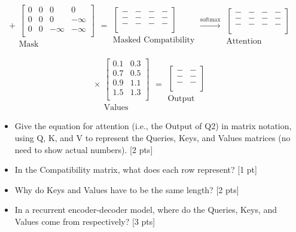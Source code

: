 \documentclass[11pt]{article}
\begin{document}
\[
+
\begin{array}{c}
\begin{bmatrix}
0 & 0 & 0 & 0 \\
0 & 0 & 0 & -\infty \\
0 & 0 & -\infty & -\infty \\
\end{bmatrix}\\
\text{Mask}
\end{array}
=
\begin{array}{c}
\begin{bmatrix}
- & - & - & - \\
- & - & - & - \\
- & - & - & - \\
\end{bmatrix}\\
\text{Masked Compatibility}
\end{array}
\xrightarrow{\text{softmax}}
\begin{array}{c}
\begin{bmatrix}
- & - & - & - \\
- & - & - & - \\
- & - & - & - \\
\end{bmatrix}\\
\text{Attention}
\end{array}
\]

\[
\times
\begin{array}{c}
\begin{bmatrix}
0.1 & 0.3 \\
0.7 & 0.5 \\
0.9 & 1.1 \\
1.5 & 1.3 \\
\end{bmatrix}\\
\text{Values}
\end{array}
=
\begin{array}{c}
\begin{bmatrix}
- & - \\
- & - \\
- & - \\
\end{bmatrix}\\
\text{Output}
\end{array}
\]

\begin{itemize}
  \item Give the equation for attention (i.e., the Output of Q2) in matrix notation, using Q, K, and V to represent the Queries, Keys, and Values matrices (no need to show actual numbers). [2 pts]
  \item In the Compatibility matrix, what does each row represent? [1 pt]
  \item Why do Keys and Values have to be the same length? [2 pts]
  \item In a recurrent encoder-decoder model, where do the Queries, Keys, and Values come from respectively? [3 pts]
\end{itemize}
\end{document}
